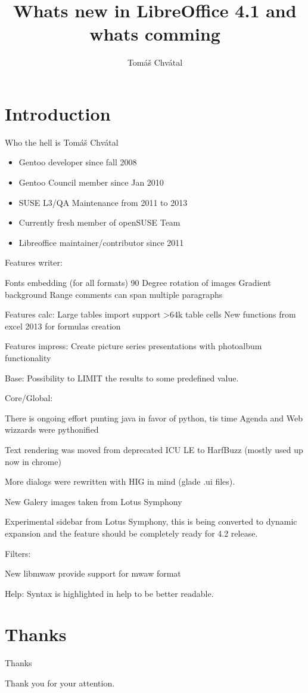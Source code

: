 \documentclass{beamer}
\author{Tom\'{a}\v{s} Chv\'{a}tal\newline {\small openSUSE Team}}
\title{Whats new in LibreOffice 4.1 and whats comming}
\begin{document}
\begin{frame}[t,plain]
\titlepage
\end{frame}

\section{Introduction}

\begin{frame}{Who the hell is Tomáš Chvátal}
	\begin{itemize}
	\item Gentoo developer since fall 2008
	\item Gentoo Council member since Jan 2010
	\item SUSE L3/QA Maintenance from 2011 to 2013
	\item Currently fresh member of openSUSE Team
	\item Libreoffice maintainer/contributor since 2011
	\end{itemize}
\end{frame}

Features writer:

Fonts embedding (for all formats)
90 Degree rotation of images
Gradient background
Range comments can span multiple paragraphs

Features calc:
Large tables import support >64k table cells
New functions from excel 2013 for formulas creation

Features impress:
Create picture series presentations with photoalbum functionality

Base:
Possibility to LIMIT the results to some predefined value.

Core/Global:

There is ongoing effort punting java in favor of python, tis time Agenda and Web wizzards were pythonified

Text rendering was moved from deprecated ICU LE to HarfBuzz (mostly used up now in chrome)

More dialogs were rewritten with HIG in mind (glade .ui files).

New Galery images taken from Lotus Symphony

Experimental sidebar from Lotus Symphony, this is being converted to dynamic expansion and the feature should be completely ready for 4.2 release.

Filters:

New libmwaw provide support for mwaw format

Help:
Syntax is highlighted in help to be better readable.


\section{Thanks}

\begin{frame}{Thanks}
	\begin{center}
	Thank you for your attention.
	\end{center}
\end{frame}
\end{document}
